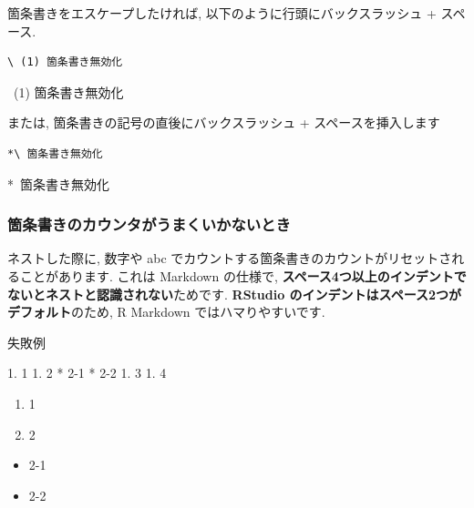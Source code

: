 \documentclass[
]{ltjsarticle}
\newenvironment{Shaded}{\begin{snugshade}}{\end{snugshade}}
\newcommand{\NormalTok}[1]{#1}
\newcommand{\SpecialStringTok}[1]{\textcolor[rgb]{0.31,0.60,0.02}{#1}}
\providecommand{\tightlist}{%
  \setlength{\itemsep}{0pt}\setlength{\parskip}{0pt}}
\begin{document}
箇条書きをエスケープしたければ, 以下のように行頭にバックスラッシュ + スペース.

\begin{verbatim}
\ (1) 箇条書き無効化
\end{verbatim}

~(1) 箇条書き無効化

または, 箇条書きの記号の直後にバックスラッシュ + スペースを挿入します

\begin{verbatim}
*\ 箇条書き無効化
\end{verbatim}

*~箇条書き無効化

\hypertarget{ux7b87ux6761ux66f8ux304dux306eux30abux30a6ux30f3ux30bfux304cux3046ux307eux304fux3044ux304bux306aux3044ux3068ux304d}{%
\subsubsection{箇条書きのカウンタがうまくいかないとき}\label{ux7b87ux6761ux66f8ux304dux306eux30abux30a6ux30f3ux30bfux304cux3046ux307eux304fux3044ux304bux306aux3044ux3068ux304d}}

ネストした際に, 数字や abc でカウントする箇条書きのカウントがリセットされることがあります. これは Markdown の仕様で, \textbf{スペース4つ以上のインデントでないとネストと認識されない}ためです. \textbf{RStudio のインデントはスペース2つがデフォルト}のため, R Markdown ではハマりやすいです.

失敗例

\begin{Shaded}
\begin{Highlighting}[]
\SpecialStringTok{1. }\NormalTok{1}
\SpecialStringTok{1. }\NormalTok{2}
\SpecialStringTok{  * }\NormalTok{2{-}1}
\SpecialStringTok{  * }\NormalTok{2{-}2}
\SpecialStringTok{1. }\NormalTok{3}
\SpecialStringTok{1. }\NormalTok{4}
\end{Highlighting}
\end{Shaded}

\begin{enumerate}
\def\labelenumi{\arabic{enumi}.}
\tightlist
\item
  1
\item
  2
\end{enumerate}

\begin{itemize}
\tightlist
\item
  2-1
\item
  2-2
\end{itemize}
\end{document}
